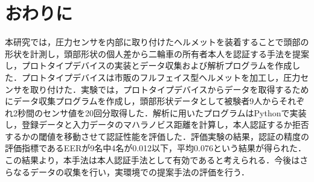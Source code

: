 \documentclass[Japanese,noauthor]{dicomopapers}
\begin{document}
\section{おわりに}
\label{conclude}
本研究では，圧力センサを内部に取り付けたヘルメットを装着することで頭部の形状を計測し，頭部形状の個人差から二輪車の所有者本人を認証する手法を提案し，プロトタイプデバイスの実装とデータ収集および解析プログラムを作成した．プロトタイプデバイスは市販のフルフェイス型ヘルメットを加工し，圧力センサを取り付けた．実験では，プロトタイプデバイスからデータを取得するためにデータ収集プログラムを作成し，頭部形状データとして被験者9人からそれぞれ2秒間のセンサ値を20回分取得した．解析に用いたプログラムはPythonで実装し，登録データと入力データのマハラノビス距離を計算し，本人認証するか拒否するかの閾値を移動させて認証性能を評価した．評価実験の結果，認証の精度の評価指標であるEERが9名中4名が0.012以下，平均0.076という結果が得られた．この結果より，本手法は本人認証手法として有効であると考えられる．今後はさらなるデータの収集を行い，実環境での提案手法の評価を行う．



\end{document}
